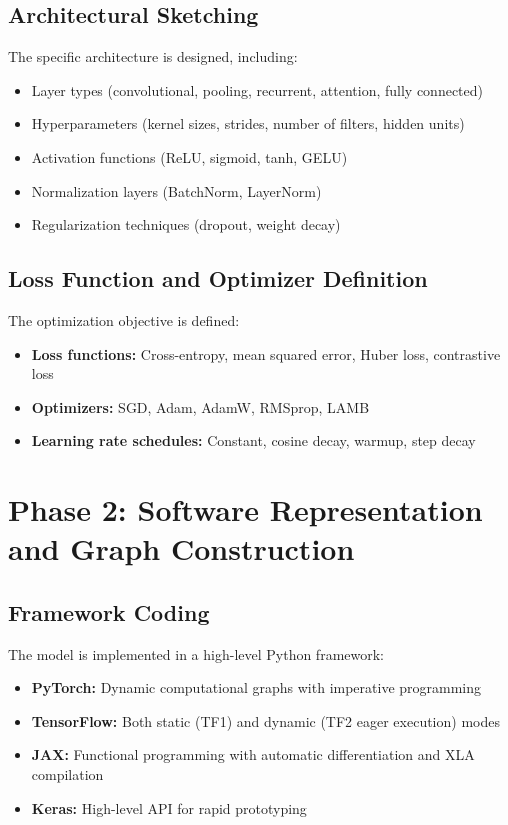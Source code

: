 \documentclass[11pt]{article}
\begin{document}
\subsection{Architectural Sketching}
The specific architecture is designed, including:
\begin{itemize}
    \item Layer types (convolutional, pooling, recurrent, attention, fully connected)
    \item Hyperparameters (kernel sizes, strides, number of filters, hidden units)
    \item Activation functions (ReLU, sigmoid, tanh, GELU)
    \item Normalization layers (BatchNorm, LayerNorm)
    \item Regularization techniques (dropout, weight decay)
\end{itemize}

\subsection{Loss Function and Optimizer Definition}
The optimization objective is defined:
\begin{itemize}
    \item \textbf{Loss functions:} Cross-entropy, mean squared error, Huber loss, contrastive loss
    \item \textbf{Optimizers:} SGD, Adam, AdamW, RMSprop, LAMB
    \item \textbf{Learning rate schedules:} Constant, cosine decay, warmup, step decay
\end{itemize}

\section{Phase 2: Software Representation and Graph Construction}

\subsection{Framework Coding}
The model is implemented in a high-level Python framework:
\begin{itemize}
    \item \textbf{PyTorch:} Dynamic computational graphs with imperative programming
    \item \textbf{TensorFlow:} Both static (TF1) and dynamic (TF2 eager execution) modes
    \item \textbf{JAX:} Functional programming with automatic differentiation and XLA compilation
    \item \textbf{Keras:} High-level API for rapid prototyping
\end{itemize}
\end{document}
